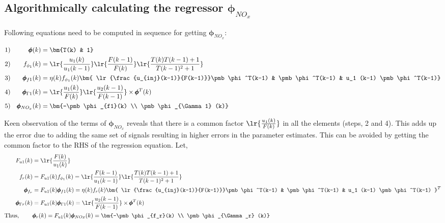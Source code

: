 \subsection{Algorithmically calculating the regressor $\pmb \phi_{NO_x}$}

Following equations need to be computed in sequence for getting $\pmb \phi_{NO_x}$:


\begin{align*}
        1)&& \pmb \phi(k) &= \bm{T(k) & 1}\\
        2)&& f_{\phi_1}(k) &= \lr{\frac{u_1(k)}{u_1(k-1)}}
                                \lr{\frac{F(k-1)}{F(k)}}
                                        \lr{\frac{T(k)T(k-1) + 1}{T(k-1)^2 + 1}}\\
        3)&& \pmb \phi_{f1}(k) &= \eta(k) f_{\phi_1}(k)
                                \bm{ \lr{\frac{u_{inj}(k-1)}{F(k-1)}}\pmb \phi^T(k-1) &
                                    \pmb \phi^T(k-1)  &
                                    u_1 (k-1) \pmb \phi^T(k-1)}   \\
        4)&& \pmb \phi_{\Gamma 1}(k) &= \lr{\frac{u_1(k)}{F(k)}} \lr{\frac{u_2(k-1)}{F(k-1)}} \times \pmb \phi^T(k) \\
        5)&& \pmb \phi_{NO_x}(k) &= \bm{-\pmb \phi_{f1}(k) \\ \pmb \phi_{\Gamma 1} (k)}
\end{align*}

Keen observation of the terms of $\pmb \phi_{NO_x}$ reveals that there is a common factor $\lr{\frac{u_1(k)}{F(k)}}$ in all the elements (steps, 2 and 4). This adds up the error due to adding the same set of signals resulting in higher errors in the parameter estimates. This can be avoided by getting the common factor to the RHS of the regression equation. Let,
\begin{align}
        F_{u1}(k) &= \lr{\frac{F(k)}{u_1(k)}}\\
        f_r(k) &= F_{u1}(k) f_{\phi_1}(k)
                = \lr{\frac{F(k-1)}{u_1(k-1)}} \lr{\frac{T(k)T(k-1) + 1}{T(k-1)^2 + 1}}\\
        \pmb \phi_{f_r} &= F_{u1}(k) \pmb \phi_{f1} (k)
                         = \eta(k) f_{r}(k)
                                \bm{ \lr{\frac{u_{inj}(k-1)}{F(k-1)}}\pmb \phi^T(k-1)
                                        & \pmb \phi^T(k-1)
                                        & u_1 (k-1) \pmb \phi^T(k-1) } ^T  \\
        \pmb \phi_{\Gamma r}(k) &= F_{u1} (k) \pmb \phi_{\Gamma 1} (k)
                                 = \lr{\frac{u_2(k-1)}{F(k-1)}} \times \pmb \phi^T(k) \\
        \text{Thus, } \qquad &
        \pmb \phi_r (k)  = F_{u1}(k) \pmb \phi_{NOx}(k)
                         = \bm{-\pmb \phi_{f_r}(k) \\ \pmb \phi_{\Gamma_r} (k)}
\end{align}

